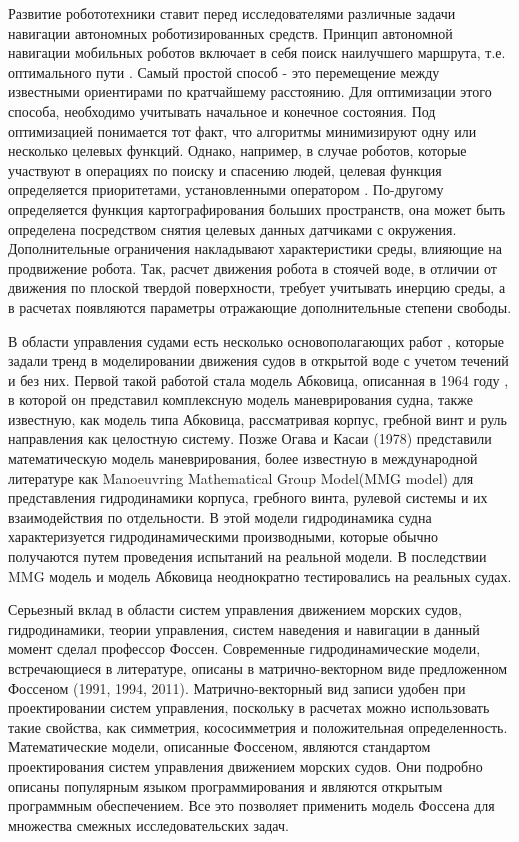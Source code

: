 
{\actuality}
 Развитие робототехники ставит перед исследователями различные задачи навигации автономных роботизированных средств.
Принцип автономной навигации мобильных роботов включает в себя поиск наилучшего маршрута, т.е. оптимального пути \cite{LiuWang2023}.
Самый простой способ - это перемещение между известными ориентирами по кратчайшему расстоянию.
Для оптимизации этого способа, необходимо учитывать начальное и конечное состояния.
Под оптимизацией понимается тот факт, что алгоритмы минимизируют одну или несколько целевых функций.
Однако, например, в случае роботов, которые участвуют в операциях по поиску и спасению людей, целевая функция определяется приоритетами, установленными оператором \cite{Calisi2007}.
По-другому определяется функция картографирования больших пространств, она может быть определена посредством снятия целевых данных датчиками с окружения.
Дополнительные ограничения накладывают характеристики среды, влияющие на продвижение робота.
Так, расчет движения робота в стоячей воде, в отличии от движения по плоской твердой поверхности, требует учитывать инерцию среды, а в расчетах появляются параметры отражающие дополнительные степени свободы.

В области управления судами есть несколько основополагающих работ \cite{Alexandersson2023}, которые задали тренд в моделировании движения судов в открытой воде с учетом течений и без них.
Первой такой работой стала модель Абковица, описанная в 1964 году \cite{Abkowitz1964}, в которой он представил комплексную модель маневрирования судна, также известную, как модель типа Абковица, рассматривая корпус, гребной винт и руль направления как целостную систему.
Позже Огава и Касаи (1978)\cite{ogawa1978} представили математическую модель маневрирования, более известную в международной литературе как Manoeuvring Mathematical Group Model(MMG model) для представления гидродинамики корпуса, гребного винта, рулевой системы и их взаимодействия по отдельности.
В этой модели гидродинамика судна характеризуется гидродинамическими производными, которые обычно получаются путем проведения испытаний на реальной модели.
В последствии MMG модель и модель Абковица неоднократно тестировались на реальных судах.

Серьезный вклад в области систем управления движением морских судов, гидродинамики, теории управления, систем наведения и навигации в данный момент сделал профессор Фоссен\cite{fossen2021handbook}.
Современные гидродинамические модели, встречающиеся в литературе, описаны в матрично-векторном виде предложенном Фоссеном (1991, 1994, 2011)\cite{fossen1991}\cite{fossen1994}\cite{fossen2011handbook}.
Матрично-векторный вид записи удобен при проектировании систем управления, поскольку в расчетах можно использовать такие свойства, как симметрия, кососимметрия и положительная определенность.
Математические модели, описанные Фоссеном, являются стандартом проектирования систем управления движением морских судов.
Они подробно описаны популярным языком программирования и являются открытым программным обеспечением.
Все это позволяет применить модель Фоссена для множества смежных исследовательских задач.

